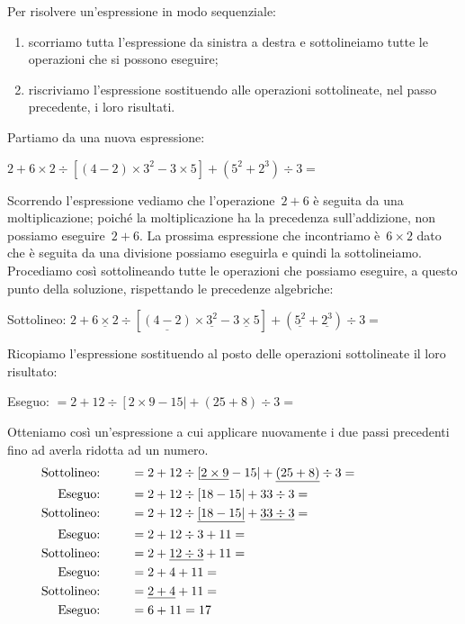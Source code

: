 \begin{procedura}
 Per risolvere un'espressione in modo sequenziale:
\begin{enumerate} [noitemsep] 
 \item scorriamo tutta l'espressione da sinistra a destra 
 e sottolineiamo tutte le operazioni che si possono eseguire;
 \item riscriviamo l'espressione sostituendo alle operazioni sottolineate,
 nel passo precedente, i loro risultati.
\end{enumerate}
\end{procedura}

Partiamo da una nuova espressione:

\(2 + 6 \times 2 \div 
 \left[ \left(4 -2 \right) \times 3^{2} - 3 \times 5 \right] +
 \left( 5^{2} + 2^{3} \right) \div 3 =\)
 
Scorrendo l'espressione vediamo che l'operazione~\(2 + 6\) è seguita da una 
moltiplicazione; poiché la moltiplicazione ha la precedenza sull'addizione,
non possiamo eseguire~\(2 + 6\). La prossima espressione che incontriamo 
è~\(6 \times 2\) dato che è seguita da una divisione possiamo eseguirla e 
quindi la sottolineiamo. Procediamo così sottolineando tutte le operazioni
che possiamo eseguire, a questo punto della soluzione, rispettando le
precedenze algebriche:

\noindent Sottolineo: \hspace{28mm} \(2 + 
 \underline{6 \times 2} \div \left[ \underline{\left(4 -2 \right)} 
   \times \underline{3^{2}} - 
   \underline{3 \times 5} \right] +
 \left( \underline{5^{2}} + \underline{2^{3}} \right) \div 3 =\)

Ricopiamo l'espressione sostituendo al posto delle operazioni 
sottolineate il loro risultato:

\noindent Eseguo: \hspace{28.7mm} \(= 2 + 
 12 \div \left[ 2 \times 9 - 15 \right| +
 \left( 25 + 8 \right) \div 3 =\)

Otteniamo così un'espressione a cui applicare nuovamente i due passi 
precedenti fino ad averla ridotta ad un numero.
\begin{align*}
\text{Sottolineo: } \qquad &= 2 + 
 12 \div \left[ \underline{2 \times 9} - 15 \right| +
 \underline{\left( 25 + 8 \right)} \div 3 = \hspace{20mm}\\ 
\text{Eseguo: } \qquad &= 2 + 12 \div \left[ 18 - 15 \right| +
 33 \div 3 =\\ 
\text{Sottolineo: } \qquad &= 2 + 
 12 \div \underline{\left[ 18 - 15 \right|} +
 \underline{33 \div 3} = \\ 
\text{Eseguo: } \qquad &= 2 + 
 12 \div 3 +
 11 = \\ 
\text{Sottolineo: } \qquad &= 2 + 
 \underline{12 \div 3} +
 11 = \\ 
\text{Eseguo: } \qquad &= 2 + 
 4 +
 11 = \\ 
\text{Sottolineo: } \qquad &= \underline{2 +  4} + 11 = \\ 
\text{Eseguo: } \qquad &= 6 + 11 = 17
\end{align*}

